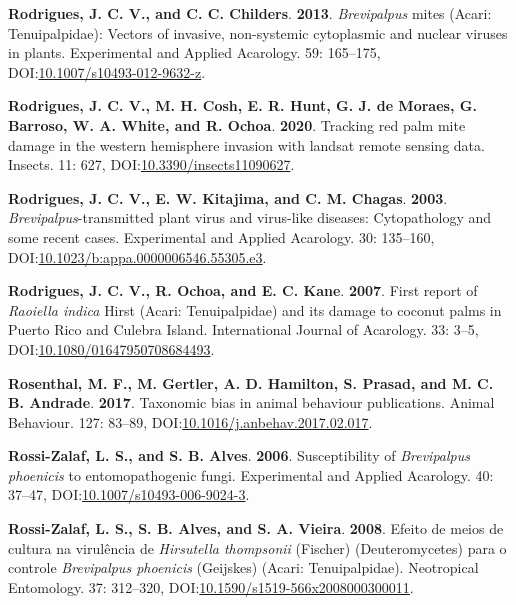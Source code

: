 \documentclass[12pt,final,CPage]{ufthesis}
\newlength{\cslhangindent}
\newenvironment{CSLReferences}[2] %
{%
	\setlength{\parindent}{0pt}
	\ifodd #1 \everypar{\setlength{\hangindent}{\cslhangindent}}\ignorespaces\fi
	\ifnum #2 > 0
	\setlength{\parskip}{#2\baselineskip}
	\fi
}%
{}
\begin{document}
{\begin{CSLReferences}{1}{0}
  \leavevmode{}%
  \textbf{Rodrigues, J. C. V., and C. C. Childers}. \textbf{2013}. {\emph{Brevipalpus}} mites ({Acari}: {Tenuipalpidae}): Vectors of invasive, non-systemic cytoplasmic and nuclear viruses in plants. Experimental and Applied Acarology. 59: 165--175, DOI:\href{https://doi.org/10.1007/s10493-012-9632-z}{10.1007/s10493-012-9632-z}.

  \leavevmode{}%
  \textbf{Rodrigues, J. C. V., M. H. Cosh, E. R. Hunt, G. J. de Moraes, G. Barroso, W. A. White, and R. Ochoa}. \textbf{2020}. Tracking red palm mite damage in the western hemisphere invasion with landsat remote sensing data. Insects. 11: 627, DOI:\href{https://doi.org/10.3390/insects11090627}{10.3390/insects11090627}.

  \leavevmode{}%
  \textbf{Rodrigues, J. C. V., E. W. Kitajima, and C. M. Chagas}. \textbf{2003}. {\emph{Brevipalpus}}-transmitted plant virus and virus-like diseases: Cytopathology and some recent cases. Experimental and Applied Acarology. 30: 135--160, DOI:\href{https://doi.org/10.1023/b:appa.0000006546.55305.e3}{10.1023/b:appa.0000006546.55305.e3}.

  \leavevmode{}%
  \textbf{Rodrigues, J. C. V., R. Ochoa, and E. C. Kane}. \textbf{2007}. First report of {\emph{Raoiella indica}} {Hirst} ({Acari}: {Tenuipalpidae}) and its damage to coconut palms in {Puerto Rico} and {Culebra Island}. International Journal of Acarology. 33: 3--5, DOI:\href{https://doi.org/10.1080/01647950708684493}{10.1080/01647950708684493}.

  \leavevmode{}%
  \textbf{Rosenthal, M. F., M. Gertler, A. D. Hamilton, S. Prasad, and M. C. B. Andrade}. \textbf{2017}. Taxonomic bias in animal behaviour publications. Animal Behaviour. 127: 83--89, DOI:\href{https://doi.org/10.1016/j.anbehav.2017.02.017}{10.1016/j.anbehav.2017.02.017}.

  \leavevmode{}%
  \textbf{Rossi-Zalaf, L. S., and S. B. Alves}. \textbf{2006}. Susceptibility of {\emph{Brevipalpus phoenicis}} to entomopathogenic fungi. Experimental and Applied Acarology. 40: 37--47, DOI:\href{https://doi.org/10.1007/s10493-006-9024-3}{10.1007/s10493-006-9024-3}.

  \leavevmode{}%
  \textbf{Rossi-Zalaf, L. S., S. B. Alves, and S. A. Vieira}. \textbf{2008}. Efeito de meios de cultura na virul{ê}ncia de {\emph{Hirsutella thompsonii}} ({Fischer}) ({Deuteromycetes}) para o controle {\emph{Brevipalpus phoenicis}} ({Geijskes}) ({Acari}: {Tenuipalpidae}). Neotropical Entomology. 37: 312--320, DOI:\href{https://doi.org/10.1590/s1519-566x2008000300011}{10.1590/s1519-566x2008000300011}.


\end{CSLReferences}}
\end{document}
